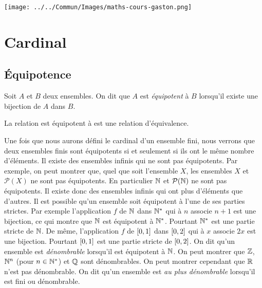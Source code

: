 \documentclass{magnolia}
\begin{document}
\hfill\texttt{[image: ../../Commun/Images/maths-cours-gaston.png]}

\magtoc

\section{Cardinal}

\subsection{Équipotence}

\begin{definition}
Soit $A$ et $B$ deux ensembles. On dit que $A$ est \emph{équipotent} à $B$
lorsqu'il existe une bijection de $A$ dans $B$.
\end{definition}

\begin{proposition}
La relation \og est équipotent à \fg est une relation d'équivalence.
\end{proposition}

\begin{remarques}
\remarque Une fois que nous aurons défini le cardinal d'un ensemble fini, nous verrons que deux ensembles
  finis sont équipotents si et seulement si ils ont le même nombre d'éléments.
\remarque Il existe des ensembles infinis qui ne sont pas équipotents. Par exemple, on peut montrer que,
  quel que soit l'ensemble $X$, les ensembles $X$ et $\mathcal{P}(X)$ ne sont pas équipotents. En particulier
  $\mathbb{N}$ et $\mathcal{P}(\mathbb{N})$ ne sont pas équipotents. Il existe donc des ensembles infinis qui ont
  \og plus d'éléments \fg que d'autres.
\remarque Il est possible qu'un ensemble soit équipotent à l'une de ses parties strictes. Par exemple
  l'application $f$ de $\mathbb{N}$ dans ${\mathbb{N}^*}$ qui à $n$ associe $n+1$ est une bijection, ce qui montre que $\mathbb{N}$
  est équipotent à ${\mathbb{N}^*}$. Pourtant ${\mathbb{N}^*}$ est une partie stricte de $\mathbb{N}$. De même, l'application $f$
  de $\left[0,1\right]$ dans $\left[0,2\right]$ qui à $x$ associe $2x$ est une bijection. Pourtant
  $\left[0,1\right]$ est une partie stricte de $\left[0,2\right]$.
\remarque On dit qu'un ensemble est \emph{dénombrable} lorsqu'il est équipotent à $\mathbb{N}$. On peut montrer
  que $\mathbb{Z}$, $\mathbb{N}^n$ (pour $n\in{\mathbb{N}^*}$) et $\mathbb{Q}$ sont dénombrables. On peut montrer cependant que $\mathbb{R}$ n'est
  pas dénombrable.  On dit qu'un ensemble est \emph{au plus dénombrable} lorsqu'il est fini ou dénombrable. 
\end{remarques}
\end{document}
